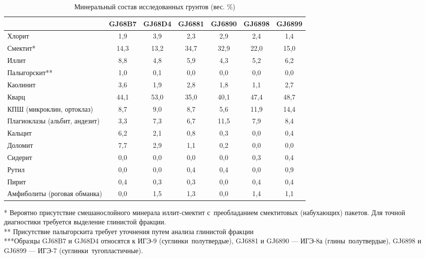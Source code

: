 \begin{table}[h!]
  \small
    \centering
  \begin{threeparttable}
  \caption{Минеральный состав исследованных грунтов (вес. \%)}
  \label{tab:mineral}
    \begin{tabular}{|l|c|c|c|c|c|c|}
        \hline
                                  & GJ68B7 & GJ68D4 & GJ6881 & GJ6890 & GJ6898 & GJ6899 \\ \hline
    Хлорит                        & 1,9  & 3,9  & 2,3  & 2,9  & 2,4  & 1,4  \\ \hline
    Смектит*                      & 14,3 & 13,2 & 34,7 & 32,9 & 22,0 & 15,0 \\ \hline
    Иллит                         & 8,8  & 4,8  & 5,9  & 4,3  & 5,2  & 6,2  \\ \hline
    Палыгорскит**                 & 1,0  & 0,1  & 0,0  & 0,0  & 0,0  & 0,0  \\ \hline
    Каолинит                      & 3,6  & 1,9  & 2,8  & 1,8  & 1,1  & 2,7  \\ \hline
    Кварц                         & 44,1 & 53,0 & 35,0 & 40,1 & 47,4 & 48,7 \\ \hline
    КПШ (микроклин, ортоклаз)     & 8,7  & 9,0  & 8,7  & 5,6  & 11,9 & 14,4 \\ \hline
    Плагиоклазы (альбит, андезит) & 3,3  & 7,3  & 6,7  & 11,5 & 7,9  & 8,4  \\ \hline
    Кальцит                       & 6,2  & 2,1  & 0,8  & 0,3  & 0,0  & 0,4  \\ \hline
    Доломит                       & 7,7  & 2,9  & 1,1  & 0,2  & 0,0  & 0,0  \\ \hline
    Сидерит                       & 0,0  & 0,0  & 0,0  & 0,0  & 0,3  & 0,4  \\ \hline
    Рутил                         & 0,0  & 0,0  & 0,4  & 0,4  & 0,0  & 0,9  \\ \hline
    Пирит                         & 0,4  & 0,3  & 0,3  & 0,0  & 0,4  & 0,4  \\ \hline
    Амфиболиты (роговая обманка)  & 0,0  & 1,5  & 1,3  & 0,0  & 1,4  & 1,1  \\ \hline
    \end{tabular}
    \raggedright 
    * Вероятно присутствие смешанослойного минерала иллит-смектит с~преобладанием смектитовых 
    (набухающих) пакетов. 
    Для точной диагностики требуется выделение глинистой фракции.
    \\
    ** Присутствие палыгорскита требует уточнения путем анализа глинистой фракции
    \\
    ***Образцы GJ68B7 и GJ68D4 относятся к ИГЭ-9 (суглинки полутвердые), GJ6881 и GJ6890 --- ИГЭ-8а (глины полутвердые), 
    GJ6898 и GJ6899 --- ИГЭ-7 (суглинки тугопластичные).
    \end{threeparttable}
    \end{table}

